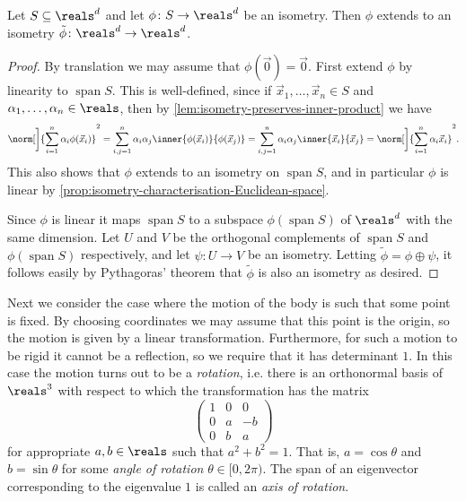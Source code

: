 \documentclass[article, a4paper, 11pt, oneside]{memoir}
\numberwithin{equation}{chapter}
\begin{document}
\begin{lemma}
    Let $S \subseteq \reals^d$ and let $\phi \colon S \to \reals^d$ be an isometry. Then $\phi$ extends to an isometry $\tilde\phi \colon \reals^d \to \reals^d$.
\end{lemma}

\newcommand{\Span}{\operatorname{span}}

\begin{proof}
    By translation we may assume that $\phi(\vec{0}) = \vec{0}$. First extend $\phi$ by linearity to $\Span S$. This is well-defined, since if $\vec{x}_1, \ldots, \vec{x}_n \in S$ and $\alpha_1, \ldots, \alpha_n \in \reals$, then by \cref{lem:isometry-preserves-inner-product} we have
    \begin{equation*}
        \norm[\bigg]{ \sum_{i=1}^n \alpha_i \phi(\vec{x}_i) }^2
            = \sum_{i,j=1}^n \alpha_i \alpha_j \inner{\phi(\vec{x}_i)}{\phi(\vec{x}_j)}
            = \sum_{i,j=1}^n \alpha_i \alpha_j \inner{\vec{x}_i}{\vec{x}_j}
            = \norm[\bigg]{ \sum_{i=1}^n \alpha_i \vec{x}_i }^2.
    \end{equation*}
    This also shows that $\phi$ extends to an isometry on $\Span S$, and in particular $\phi$ is linear by \cref{prop:isometry-characterisation-Euclidean-space}.

    Since $\phi$ is linear it maps $\Span S$ to a subspace $\phi(\Span S)$ of $\reals^d$ with the same dimension. Let $U$ and $V$ be the orthogonal complements of $\Span S$ and $\phi(\Span S)$ respectively, and let $\psi \colon U \to V$ be an isometry. Letting $\tilde{\phi} = \phi \oplus \psi$, it follows easily by Pythagoras' theorem that $\tilde{\phi}$ is also an isometry as desired.
\end{proof}

Next we consider the case where the motion of the body is such that some point is fixed. By choosing coordinates we may assume that this point is the origin, so the motion is given by a linear transformation. Furthermore, for such a motion to be rigid it cannot be a reflection, so we require that it has determinant $1$. In this case the motion turns out to be a \emph{rotation}, i.e. there is an orthonormal basis of $\reals^3$ with respect to which the transformation has the matrix
%
\begin{equation}
    \label{eq:rotation-matrix}
    \begin{pmatrix}
        1 & 0 & 0 \\
        0 & a & -b \\
        0 & b & a
    \end{pmatrix}
\end{equation}
%
for appropriate $a,b \in \reals$ such that $a^2 + b^2 = 1$. That is, $a = \cos\theta$ and $b = \sin\theta$ for some \emph{angle of rotation} $\theta \in [0, 2\pi)$. The span of an eigenvector corresponding to the eigenvalue $1$ is called an \emph{axis of rotation}.
\end{document}
